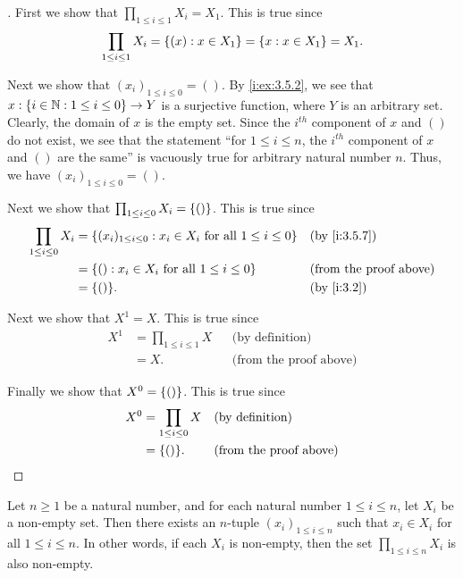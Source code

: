 \begin{proof}[]
  First we show that \(\prod_{1 \leq i \leq 1} X_i = X_1\).
  This is true since
  \[
    \prod_{1 \leq i \leq 1} X_i = \left\lbrace(x) : x \in X_1\right\rbrace = \left\lbrace x : x \in X_1\right\rbrace = X_1.
  \]

  Next we show that \((x_i)_{1 \leq i \leq 0} = ()\).
  By \cref{i:ex:3.5.2}, we see that \(x : \left\lbrace i \in \mathbb{N} : 1 \leq i \leq 0\right\rbrace \to Y\) is a surjective function, where \(Y\) is an arbitrary set.
  Clearly, the domain of \(x\) is the empty set.
  Since the \(i^{th}\) component of \(x\) and \(()\) do not exist, we see that the statement ``for \(1 \leq i \leq n\), the \(i^{th}\) component of \(x\) and \(()\) are the same'' is vacuously true for arbitrary natural number \(n\).
  Thus, we have \((x_i)_{1 \leq i \leq 0} = ()\).

  Next we show that \(\prod_{1 \leq i \leq 0} X_i = \left\lbrace()\right\rbrace\).
  This is true since
  \begin{align*}
    \prod_{1 \leq i \leq 0} X_i & = \set{(x_i)_{1 \leq i \leq 0} : x_i \in X_i \text{ for all } 1 \leq i \leq 0} &  & \by{i:3.5.7}                  \\
                                & = \set{() : x_i \in X_i \text{ for all } 1 \leq i \leq 0}                      &  & \text{(from the proof above)} \\
                                & = \set{()}.                                                                    &  & \by{i:3.2}
  \end{align*}

  Next we show that \(X^1 = X\).
  This is true since
  \begin{align*}
    X^1 & = \prod_{1 \leq i \leq 1} X &  & \text{(by definition)}        \\
        & = X.                        &  & \text{(from the proof above)}
  \end{align*}

  Finally we show that \(X^0 = \left\lbrace()\right\rbrace\).
  This is true since
  \begin{align*}
    X^0 & = \prod_{1 \leq i \leq 0} X &  & \text{(by definition)}        \\
        & = \set{()}.                 &  & \text{(from the proof above)}
  \end{align*}
\end{proof}

\setcounter{thm}{11}
\begin{lem}\label{i:3.5.12}
  Let \(n \geq 1\) be a natural number, and for each natural number \(1 \leq i \leq n\), let \(X_i\) be a non-empty set.
  Then there exists an \(n\)-tuple \((x_i)_{1 \leq i \leq n}\) such that \(x_i \in X_i\) for all \(1 \leq i \leq n\).
  In other words, if each \(X_i\) is non-empty, then the set \(\prod_{1 \leq i \leq n} X_i\) is also non-empty.
\end{lem}

